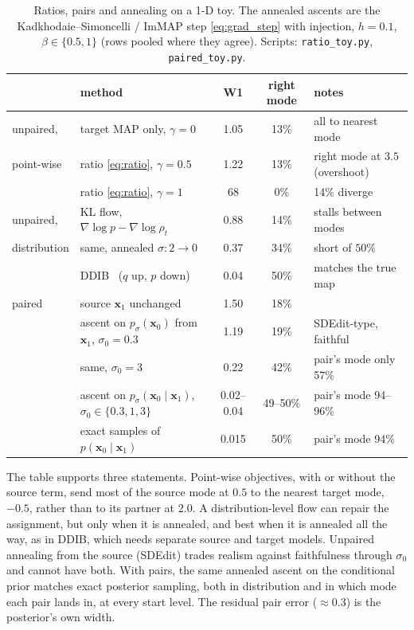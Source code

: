 \documentclass[11pt]{article}
\theoremstyle{definition}
\theoremstyle{remark}
\newcommand{\x}{\bm{x}}
\newcommand{\grad}{\nabla}
\newcommand{\code}[1]{\texttt{#1}}
\begin{document}
\begin{table}[h]
\centering
\scriptsize
\begin{tabular}{@{}llccl@{}}
\toprule
& method & W1 & right mode & notes \\
\midrule
unpaired, & target MAP only, $\gamma=0$ & 1.05 & 13\% & all to nearest mode \\
point-wise & ratio \eqref{eq:ratio}, $\gamma=0.5$ & 1.22 & 13\% & right mode at $3.5$
  (overshoot) \\
& ratio \eqref{eq:ratio}, $\gamma=1$ & 68 & 0\% & 14\% diverge \\
\midrule
unpaired, & KL flow, $\grad\log p - \grad\log\rho_t$ & 0.88 & 14\% & stalls between modes \\
distribution & same, annealed $\sigma: 2\to0$ & 0.37 & 34\% & short of $50\%$ \\
& DDIB~\cite{su2023} ($q$ up, $p$ down) & 0.04 & 50\% & matches the true map \\
\midrule
paired & source $\x_1$ unchanged & 1.50 & 18\% & \\
& ascent on $p_\sigma(\x_0)$ from $\x_1$, $\sigma_0 = 0.3$ & 1.19 & 19\% &
  SDEdit-type, faithful \\
& \quad same, $\sigma_0 = 3$ & 0.22 & 42\% & pair's mode only 57\% \\
& ascent on $p_\sigma(\x_0\mid\x_1)$, $\sigma_0\in\{0.3,1,3\}$ & 0.02--0.04 &
  49--50\% & pair's mode 94--96\% \\
& exact samples of $p(\x_0\mid\x_1)$ & 0.015 & 50\% & pair's mode 94\% \\
\bottomrule
\end{tabular}
\caption{Ratios, pairs and annealing on a 1-D toy. The annealed ascents are the
Kadkhodaie--Simoncelli / ImMAP step \eqref{eq:grad_step} with injection, $h = 0.1$,
$\beta\in\{0.5,1\}$ (rows pooled where they agree). Scripts: \code{ratio\_toy.py},
\code{paired\_toy.py}.}
\label{tab:pairs_toy}
\end{table}

The table supports three statements. Point-wise objectives, with or without the source term,
send most of the source mode at $0.5$ to the nearest target mode, $-0.5$, rather than to its
partner at $2.0$. A distribution-level flow can repair the assignment, but only when it is
annealed, and best when it is annealed all the way, as in DDIB, which needs separate source
and target models. Unpaired annealing from the source (SDEdit) trades realism against
faithfulness through $\sigma_0$ and cannot have both. With pairs, the same annealed ascent on
the conditional prior matches exact posterior sampling, both in distribution and in which mode
each pair lands in, at every start level. The residual pair error ($\approx0.3$) is the
posterior's own width.
\end{document}
